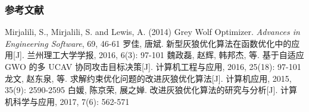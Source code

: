 \begin{frame}
	\frametitle{参考文献}
	\begin{thebibliography}{99} 
	 Mirjalili, S., Mirjalili, S. and Lewis, A. (2014) Grey Wolf Optimizer. \emph{Advances in Engineering Software}, 69, 46-61
	 罗佳, 唐斌. 新型灰狼优化算法在函数优化中的应用[J]. 兰州理工大学学报, 2016, 6(3): 97-101  
	 魏政磊, 赵辉, 韩邦杰, 等. 基于自适应 GWO 的多 UCAV 协同攻击目标决策[J]. 计算机工程与应用, 2016, 25(18): 97-101
	 龙文, 赵东泉, 等. 求解约束优化问题的改进灰狼优化算法[J]. 计算机应用, 2015, 35(9): 2590-2595
	 白媛, 陈京荣, 展之婵. 改进灰狼优化算法的研究与分析[J]. 计算机科学与应用, 2017, 7(6): 562-571
	\end{thebibliography}
\end{frame}